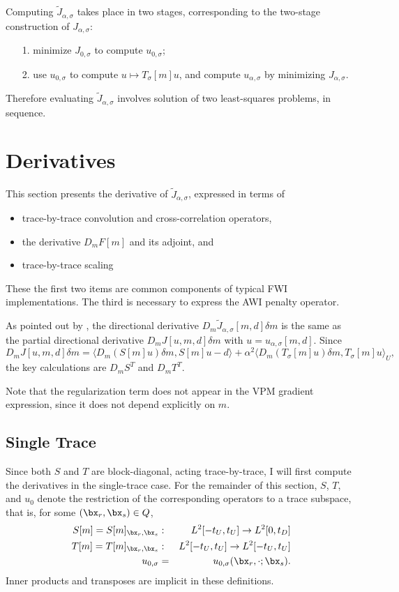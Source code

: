 Computing $\tilde{J}_{\alpha,\sigma}$ takes place in two stages, corresponding to the two-stage construction of $J_{\alpha,\sigma}$:
\begin{itemize}
\item[1. ] minimize $J_{0,\sigma}$ to compute $u_{0,\sigma}$;
\item[2. ] use $u_{0,\sigma}$ to compute $u \mapsto T_{\sigma}[m]u$, and compute $u_{\alpha,\sigma}$ by minimizing $J_{\alpha,\sigma}$.
\end{itemize}
Therefore evaluating $\tilde{J}_{\alpha,\sigma}$ involves solution of two least-squares problems, in sequence.

\section{Derivatives}
This section presents the derivative of $\tilde{J}_{\alpha,\sigma}$, expressed in terms of
\begin{itemize}
  \item trace-by-trace convolution and cross-correlation operators,
  \item the derivative $D_mF[m]$ and its adjoint, and
  \item trace-by-trace scaling
\end{itemize}
These the first two items are common components of typical FWI implementations. The
third is necessary to express the AWI penalty operator.

As pointed out by \cite{GolubPeyreyra:73}, the directional derivative $D_m\tilde{J}_{\alpha,\sigma}[m,d]\delta m$ is the same as the partial directional derivative $D_mJ[u,m,d]\delta m$ with $u = u_{\alpha,\sigma}[m,d]$. Since 
\begin{equation}
D_mJ[u,m,d]\delta m = \langle D_m(S[m]u)\delta m, S[m]u-d \rangle + \alpha^2 \langle D_m(T_{\sigma}[m]u)\delta m,T_{\sigma}[m]u\rangle_U,
\label{eqn:basederiv}
\end{equation}
the key calculations are $D_mS^T$ and $D_m T^T$. 

Note that the regularization term does not appear in the VPM gradient expression, since it does not depend explicitly on $m$.

\subsection{Single Trace}

Since both $S$ and $T$ are block-diagonal, acting trace-by-trace, I will first compute the derivatives in the single-trace case. For the remainder of this section, $S$, $T$, and $u_0$ denote the restriction of the corresponding operators to a trace subspace, that is, for some $(\bx_r,\bx_s) \in Q$,
\begin{eqnarray*}
  S[m] = S[m]_{\bx_r,\bx_s}&: & L^2[-t_U,t_U] \rightarrow L^2[0,t_D] \\
  T[m] = T[m]_{\bx_r,\bx_s}&: & L^2[-t_U,t_U] \rightarrow L^2[-t_U,t_U] \\
  u_{0,\sigma} &=& u_{0,\sigma}(\bx_r,\cdot;\bx_s).
\end{eqnarray*}
Inner products and transposes are implicit in these definitions.

